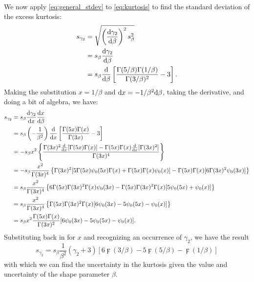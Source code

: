 We now apply \eqref{eq:general_stdev} to \eqref{eq:kurtosis} to find the standard deviation of the excess kurtosis:
\begin{align} \label{eq:kurt_err_partial1}
	s_{\gamma_{2}} &= \sqrt{ \left( \frac{{\rm {d}} \gamma_{2}}{{\rm {d}} \beta} \right)^{2} s_{\beta}^{2} } \\
		&= s_{\beta} \frac{{\rm {d}} \gamma_{2}}{{\rm {d}} \beta} \\
		&= s_{\beta} \frac{{\rm {d}}}{{\rm {d}} \beta} \left[ \frac{\Gamma(5/\beta) \Gamma(1/\beta)}{\Gamma(3/\beta)^{2}} - 3 \right].
\end{align}
Making the substitution $x = 1 / \beta$ and ${\rm {d}} x = - 1 / \beta^{2} {\rm {d}} \beta$, taking the derivative, and doing a bit of algebra, we have:
\begin{align} \label{eq:kurt_err_partial2}
	s_{\gamma_{2}} &= s_{\beta} \frac{{\rm {d}} \gamma_{2}}{{\rm {d}} x} \frac{{\rm {d}} x}{{\rm {d}} \beta} \\
		&= s_{\beta} \left( -\frac{1}{\beta^{2}} \right) \frac{{\rm {d}}}{{\rm {d}} x} \left[ \frac{\Gamma(5x) \Gamma(x)}{\Gamma(3x)} - 3 \right] \\
		&= -s_{\beta} x^{2} \left\{ \frac{\Gamma(3x)^{2} \frac{{\rm {d}}}{{\rm {d}} x} [\Gamma(5x) \Gamma(x)] - \Gamma(5x) \Gamma(x) \frac{{\rm {d}}}{{\rm {d}} x} [\Gamma(3x)^{2}]}{\Gamma(3x)^{4}} \right\} \\
		&= -s_{\beta} \frac{x^{2}}{\Gamma(3x)^{4}} \left\{ \Gamma(3x)^{2} [5\Gamma(5x) {\psi_{0}}(5x) \Gamma(x) + \Gamma(5x) \Gamma(x) {\psi_{0}}(x)] - \Gamma(5x) \Gamma(x) [6\Gamma(3x)^{2} {\psi_{0}}(3x)] \right\} \\
		&= s_{\beta} \frac{x^{2}}{\Gamma(3x)^{4}} \left\{ 6\Gamma(5x) \Gamma(3x)^{2} \Gamma(x) {\psi_{0}}(3x) - \Gamma(5x) \Gamma(3x)^{2} \Gamma(x) [5{\psi_{0}}(5x) + {\psi_{0}}(x)] \right\} \\
		&= s_{\beta} \frac{x^{2}}{\Gamma(3x)^{4}} \left\{ \Gamma(5x) \Gamma(3x)^{2} \Gamma(x) [6{\psi_{0}}(3x) - 5{\psi_{0}}(5x) - {\psi_{0}}(x)] \right\} \\
		&= s_{\beta} x^{2} \frac{\Gamma(5x) \Gamma(x)}{\Gamma(3x)^{2}} [6{\psi_{0}}(3x) - 5{\psi_{0}}(5x) - {\psi_{0}}(x)].
\end{align}
Substituting back in for $x$ and recognizing an occurrence of $\gamma_{2}$, we have the result
\begin{equation} \label{eq:kurt_err}
	s_{\gamma_{2}} = s_{\beta} \frac{1}{\beta^{2}} \left( \gamma_{2} + 3 \right) \left[ 6 \digamma(3/\beta) - 5 \digamma(5/\beta) - \digamma(1/\beta) \right]
\end{equation}
with which we can find the uncertainty in the kurtosis given the value and uncertainty of the shape parameter $\beta$.

